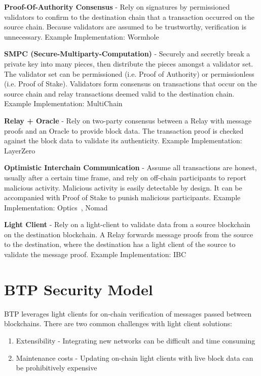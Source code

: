 \documentclass{article}
\begin{document}
\textbf{Proof-Of-Authority Consensus} - Rely on signatures by permissioned validators to confirm to the destination chain that a transaction occurred on the source chain. Because validators are assumed to be trustworthy, verification is unnecessary.
Example Implementation: Wormhole \cite{wormhole}

\textbf{SMPC (Secure-Multiparty-Computation)} - Securely and secretly break a private key into many pieces, then distribute the pieces amongst a validator set. The validator set can be permissioned (i.e. Proof of Authority) or permissionless (i.e. Proof of Stake). Validators form consensus on transactions that occur on the source chain and relay transactions deemed valid to the destination chain.
Example Implementation: MultiChain~\cite{multichain}

\textbf{Relay + Oracle} - Rely on two-party consensus between a Relay with message proofs and an Oracle to provide block data. The transaction proof is checked against the block data to validate its authenticity.
Example Implementation: LayerZero~\cite{layerzero}

\textbf{Optimistic Interchain Communication} - Assume all transactions are honest, usually after a certain time frame, and rely on off-chain participants to report malicious activity. Malicious activity is easily detectable by design. It can be accompanied with Proof of Stake to punish malicious participants.
Example Implementation: Optics~\cite{optics}, Nomad~\cite{nomad}

\textbf{Light Client} - Rely on a light-client to validate data from a source blockchain on the destination blockchain. A Relay forwards message proofs from the source to the destination, where the destination has a light client of the source to validate the message proof.
Example Implementation: IBC~\cite{cosmos}

\section{BTP Security Model}
\label{chap:overview}
BTP leverages light clients for on-chain verification of messages passed between blockchains. There are two common challenges with light client solutions:

\begin{enumerate}
\item Extensibility - Integrating new networks can be difficult and time consuming
\item Maintenance costs - Updating on-chain light clients with live block data can be prohibitively expensive
\end{enumerate}
\end{document}
